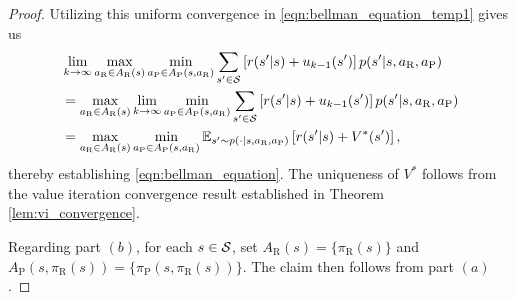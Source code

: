 \documentclass[11pt]{article}
\begin{document}
\begin{proof}
           Utilizing this uniform convergence in \eqref{eqn:bellman_equation_temp1} gives us 
           \begin{align*}
           &\lim_{k \to \infty}\max_{a_\text{R} \in A_\text{R}(s)}\min_{a_\text{P} \in A_\text{P}(s,a_\text{R})}\sum_{s' \in {\cal S}}\left[r(s'|s) + u_{k-1}(s')\right]p(s'|s,a_\text{R},a_\text{P})\\
           &= \max_{a_\text{R} \in A_\text{R}(s)}\lim_{k \to \infty}\min_{a_\text{P} \in A_\text{P}(s,a_\text{R})}\sum_{s' \in {\cal S}}\left[r(s'|s) + u_{k-1}(s')\right]p(s'|s,a_\text{R},a_\text{P})\\
           &= \max_{a_\text{R} \in A_\text{R}(s)}\min_{a_\text{P} \in A_\text{P}(s,a_\text{R})}\mathbb{E}_{s' \sim p(\cdot|s,a_\text{R},a_\text{P})}\left[r(s'|s) + V^*(s')\right],
           \end{align*}
           thereby establishing \eqref{eqn:bellman_equation}. The uniqueness of $V^*$ follows from the value iteration convergence result established in Theorem \ref{lem:vi_convergence}.
    
           Regarding part $(b)$, for each $s \in {\cal S}$, set $A_\text{R}(s) = \{\pi_\text{R}(s)\}$ and $A_\text{P}(s,\pi_\text{R}(s)) = \{\pi_\text{P}(s,\pi_\text{R}(s))\}$. The claim then  follows from part $(a)$.
       \end{proof}
    
\end{document}
